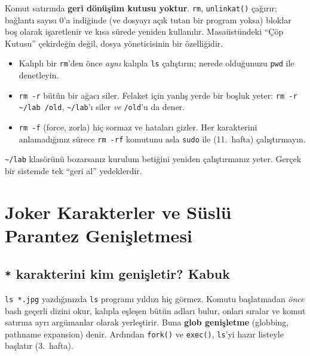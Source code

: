 \documentclass[11pt,a4paper]{article}
\newcommand{\term}[1]{\textbf{\color{mintdeep}#1}}
\newcommand{\cmd}[1]{\texttt{#1}}
\begin{document}
\begin{keyidea}
Komut satırında \textbf{geri dönüşüm kutusu yoktur}. \cmd{rm}, \cmd{unlinkat()} çağırır; bağlantı sayısı $0$'a indiğinde (ve dosyayı açık tutan bir program yoksa) bloklar boş olarak işaretlenir ve kısa sürede yeniden kullanılır. Masaüstündeki ``Çöp Kutusu'' çekirdeğin değil, dosya yöneticisinin bir özelliğidir.
\begin{itemize}
  \item Kalıplı bir \cmd{rm}'den önce \emph{aynı} kalıpla \cmd{ls} çalıştırın; nerede olduğunuzu \cmd{pwd} ile denetleyin.
  \item \cmd{rm -r} bütün bir ağacı siler. Felaket için yanlış yerde bir boşluk yeter: \cmd{rm -r \textasciitilde/lab /old}, \texttt{\textasciitilde/lab}'ı siler \emph{ve} \texttt{/old}'u da dener.
  \item \cmd{rm -f} (force, zorla) hiç sormaz ve hataları gizler. Her karakterini anlamadığınız sürece \cmd{rm -rf} komutunu asla \cmd{sudo} ile (11.~hafta) çalıştırmayın.
\end{itemize}
\texttt{\textasciitilde/lab} klasörünü bozarsanız kurulum betiğini yeniden çalıştırmanız yeter. Gerçek bir sistemde tek ``geri al'' yedeklerdir.
\end{keyidea}

\section{Joker Karakterler ve Süslü Parantez Genişletmesi}
\label{sec:glob}

\subsection{\texttt{*} karakterini kim genişletir? Kabuk}

\cmd{ls *.jpg} yazdığınızda \cmd{ls} programı yıldızı hiç görmez. Komutu başlatmadan \emph{önce} bash geçerli dizini okur, kalıpla eşleşen bütün adları bulur, onları sıralar ve komut satırına ayrı argümanlar olarak yerleştirir. Buna \term{glob genişletme} (globbing, pathname expansion) denir. Ardından \cmd{fork()} ve \cmd{exec()}, \cmd{ls}'yi hazır listeyle başlatır (3.~hafta).
\end{document}
